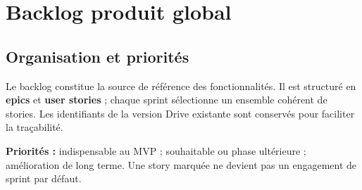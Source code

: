 \chapter{Backlog produit global}
\section{Organisation et priorités}
Le backlog constitue la source de référence des fonctionnalités. Il est structuré en \textbf{epics} et \textbf{user stories} ; chaque sprint sélectionne un ensemble cohérent de stories. Les identifiants de la version Drive existante sont conservés pour faciliter la traçabilité.

\begin{notebox}
\textbf{Priorités :}  indispensable au MVP ;  souhaitable ou phase ultérieure ;  amélioration de long terme. Une story marquée  ne devient pas un engagement de sprint par défaut.
\end{notebox}


